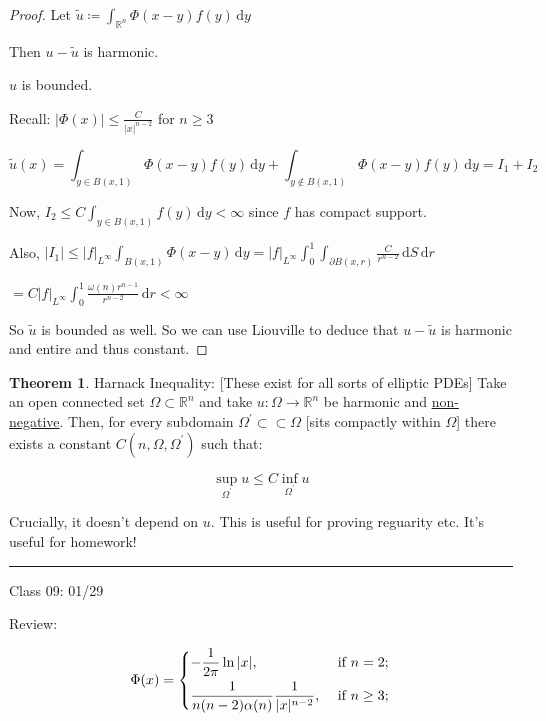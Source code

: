 \documentclass{article}
\theoremstyle{definition}
\newtheorem{theorem}{Theorem}
\begin{document}
\begin{proof}
    Let \(\tilde{u}\coloneqq \int_{\mathbb{R}^n}^{} \Phi(x-y)f(y) \,\mathrm{d}y \)
    
    Then \(u-\tilde{u}\) is harmonic.

    \(u\) is bounded.

    Recall: \(\vert \Phi(x) \vert \leq \frac{C}{\vert x \vert ^{n-2}}\) for \(n \geq 3\)   

    \[
        \tilde{u}(x)=\int_{y\in B(x,1)}^{} \Phi(x-y)f(y) \,\mathrm{d}y + \int_{y\notin B(x,1)}^{} \Phi(x-y)f(y) \,\mathrm{d}y = I_1 + I_2
    \]

    Now, \(I_2 \leq  C \int_{y\in B(x,1)}^{} f(y) \,\mathrm{d}y <\infty \) since \(f\) has compact support.
    
    Also, \(\vert I_1 \vert \leq \vert f \vert _{L^{\infty}} \int_{B(x,1)}^{} \Phi(x-y) \,\mathrm{d}y = \vert f \vert _{L^{\infty}} \int_{0}^{1} \int_{\partial B(x,r)}^{} \frac{C}{r^{n-2} } \,\mathrm{d}S  \,\mathrm{d}r \)
    
    \(= C \vert f \vert_{L^{\infty}} \int_{0}^{1} \frac{\omega(n)r^{n-1}}{r^{n-2}} \,\mathrm{d}r < \infty  \) 

    So \(\tilde{u}\) is bounded as well. So we can use Liouville to deduce that \(u-\tilde{u}\) is harmonic and entire and thus constant.
    
\end{proof}

\begin{theorem}
    Harnack Inequality: [These exist for all sorts of elliptic PDEs] Take an open connected set \(\Omega \subset \mathbb{R} ^n\) and take \(u:\Omega \to \mathbb{R} ^n\) be harmonic and \underline{non-negative}. Then, for every subdomain \(\Omega ^{\prime} \subset \subset \Omega\) [sits compactly within \(\Omega \)] there exists a constant \(C(n,\Omega ,\Omega ^{\prime})\) such that:

    \[
        \sup_{\Omega ^{\prime} } u \leq C \inf _{\Omega ^{\prime} } u
    \]

    Crucially, it doesn't depend on \(u\). This is useful for proving reguarity etc. It's useful for homework!

\end{theorem}

\hfil
\hrule

Class 09: 01/29

Review:

\[
    \Phi(x)=\begin{dcases}
        -\frac{1}{2\pi }\ln \vert x \vert , &\text{ if } n=2 ;\\
        \frac{1}{n(n-2)\alpha (n)}\frac{1}{\vert x \vert ^{n-2}}, &\text{ if } n \geq 3 ;
    \end{dcases}
\]
\end{document}
